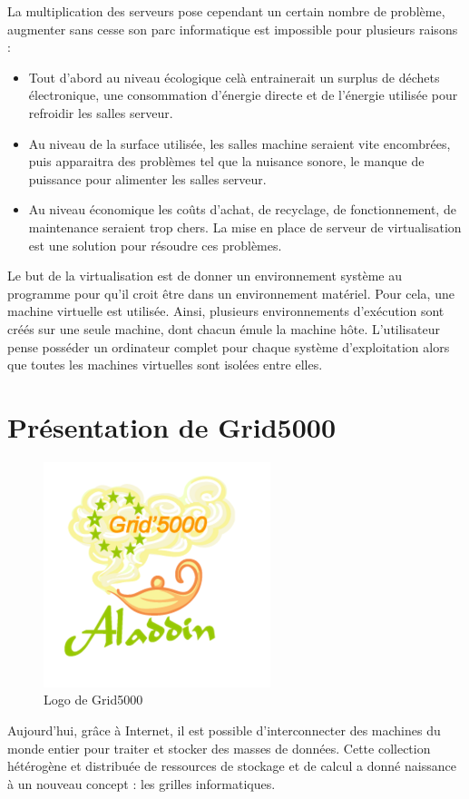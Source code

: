 La multiplication des serveurs pose cependant un certain nombre
de problème, augmenter sans cesse son parc informatique est impossible
pour plusieurs raisons : 
\begin{itemize}
\item Tout d'abord au niveau écologique celà entrainerait un surplus de déchets électronique, une consommation d'énergie directe et de l'énergie utilisée pour refroidir les salles serveur.
\item Au niveau de la surface utilisée, les salles machine seraient vite encombrées, puis apparaitra des problèmes tel que la nuisance sonore, le manque de puissance pour alimenter les salles serveur. 
\item Au niveau économique les coûts d'achat, de recyclage, de fonctionnement, de maintenance seraient trop chers. La mise en place de serveur de virtualisation est une solution pour résoudre ces problèmes.
\end{itemize}

Le but de la virtualisation est de donner un environnement système
au programme pour qu'il croit être dans un environnement
matériel. Pour cela, une machine virtuelle est utilisée. Ainsi, plusieurs
environnements d'exécution sont créés sur une seule
machine, dont chacun émule la machine hôte. L'utilisateur
pense posséder un ordinateur complet pour chaque système d'exploitation
alors que toutes les machines virtuelles sont isolées entre elles.


\newpage

\section{Présentation de Grid5000}
\begin{figure}
\begin{center}
\includegraphics{images/logo.png}
\caption{Logo de Grid5000}
\end{center}

\end{figure}
Aujourd’hui, grâce à Internet, il est possible
d’interconnecter des machines du monde entier pour
traiter et stocker des masses de données. Cette collection
hétérogène et distribuée de ressources de stockage et de
calcul a donné naissance à un nouveau concept : les
grilles informatiques.

